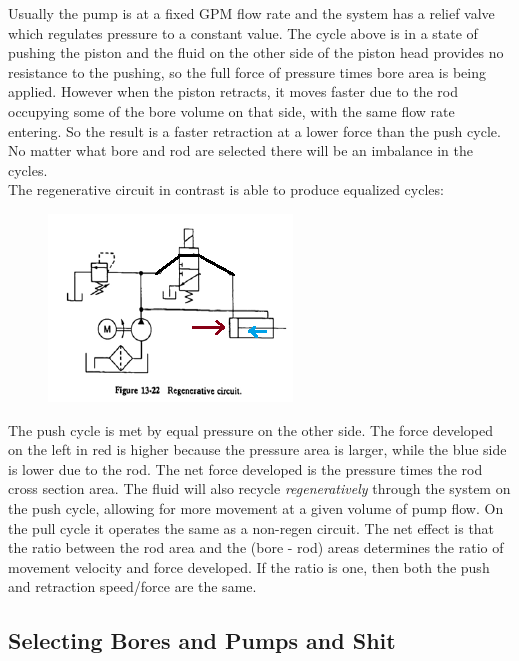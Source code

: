 \documentclass[11pt, fleqn]{article}
\begin{document}
Usually the pump is at a fixed GPM flow rate and the system has a relief valve which regulates pressure to a constant value.  The cycle above is in a state of pushing the piston and the fluid on the other side of the piston head provides no resistance to the pushing, so the full force of pressure times bore area is being applied.  However when the piston retracts, it moves faster due to the rod occupying some of the bore volume on that side, with the same flow rate entering.  So the result is a faster retraction at a lower force than the push cycle.  No matter what bore and rod are selected there will be an imbalance in the cycles.\\

The regenerative circuit in contrast is able to produce equalized cycles:

    \begin{figure}[!h]
    \centering
            \includegraphics[scale=1.0]{Fluids/regenCircuitAnnotated.png}
    \end{figure}

The push cycle is met by equal pressure on the other side.  The force developed on the left in red is higher because the pressure area is larger, while the blue side is lower due to the rod.  The net force developed is the pressure times the rod cross section area.  The fluid will also recycle \textit{regeneratively} through the system on the push cycle, allowing for more movement at a given volume of pump flow.  On the pull cycle it operates the same as a non-regen circuit.  The net effect is that the ratio between the rod area and the (bore - rod) areas determines the ratio of movement velocity and force developed.  If the ratio is one, then both the push and retraction speed/force are the same.\\


    
    

\subsection{Selecting Bores and Pumps and Shit}
\end{document}
